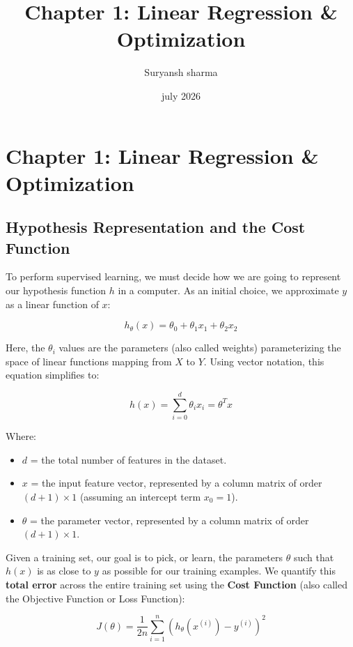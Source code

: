 \documentclass[12pt, a4paper]{report}
\title{Chapter 1: Linear Regression \& Optimization}
\author{Suryansh sharma}
\date{july 2026}
\begin{document}
\maketitle
\tableofcontents
\newpage

\setcounter{chapter}{1} %
\chapter*{Chapter 1: Linear Regression \& Optimization}

\section{Hypothesis Representation and the Cost Function}

To perform supervised learning, we must decide how we are going to represent our hypothesis function $h$ in a computer. As an initial choice, we approximate $y$ as a linear function of $x$:

\[ h_\theta(x) = \theta_0 + \theta_1 x_1 + \theta_2 x_2 \]

Here, the $\theta_i$ values are the parameters (also called weights) parameterizing the space of linear functions mapping from $X$ to $Y$. Using vector notation, this equation simplifies to:

\[ h(x) = \sum_{i=0}^{d} \theta_i x_i = \theta^T x \]

Where:
\begin{itemize}
    \item \textbf{$d$} = the total number of features in the dataset.
    \item \textbf{$x$} = the input feature vector, represented by a column matrix of order $(d+1) \times 1$ (assuming an intercept term $x_0 = 1$).
    \item \textbf{$\theta$} = the parameter vector, represented by a column matrix of order $(d+1) \times 1$.
\end{itemize}

Given a training set, our goal is to pick, or learn, the parameters $\theta$ such that $h(x)$ is as close to $y$ as possible for our training examples. We quantify this \textbf{total error} across the entire training set using the \textbf{Cost Function} (also called the Objective Function or Loss Function):

\[ J(\theta) = \frac{1}{2n} \sum_{i=1}^{n} \left( h_\theta(x^{(i)}) - y^{(i)} \right)^2 \]
\end{document}

